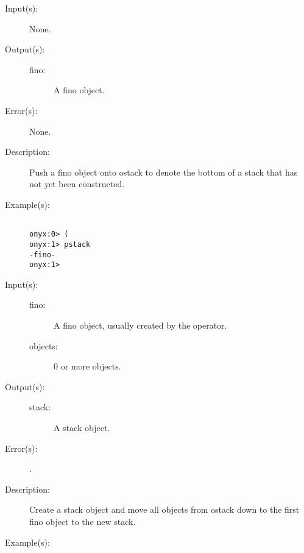 \begin{description}
\label{systemdict:sym_lp}
\item[{\onyxop{--}{(}{fino}}: ]
	\begin{description}\item[]
	\item[Input(s): ] None.
	\item[Output(s): ]
		\begin{description}\item[]
		\item[fino: ]
			A fino object.
		\end{description}
	\item[Error(s): ] None.
	\item[Description: ]
		Push a fino object onto ostack to denote the bottom of a stack
		that has not yet been constructed.
	\item[Example(s): ]\begin{verbatim}

onyx:0> (
onyx:1> pstack
-fino-
onyx:1>
		\end{verbatim}
	\end{description}
\label{systemdict:sym_rp}
\item[{\onyxop{fino objects}{)}{stack}}: ]
	\begin{description}\item[]
	\item[Input(s): ]
		\begin{description}\item[]
		\item[fino: ]
			A fino object, usually created by the \onyxop{}{)}{}
			operator.
		\item[objects: ]
			0 or more objects.
		\end{description}
	\item[Output(s): ]
		\begin{description}\item[]
		\item[stack: ]
			A stack object.
		\end{description}
	\item[Error(s): ]
		\begin{description}\item[]
		\item[.]
		\end{description}
	\item[Description: ]
		Create a stack object and move all objects from ostack down to
		the first fino object to the new stack.
	\item[Example(s): ]\begin{verbatim}


\end{verbatim}
\end{description}
\end{description}
